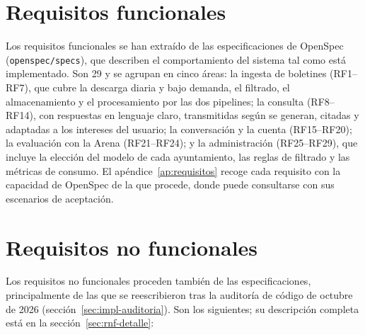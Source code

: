 \section{Requisitos funcionales}
\label{sec:rf}

Los requisitos funcionales se han extraído de las especificaciones de OpenSpec (\texttt{openspec/specs}), que describen el comportamiento del sistema tal como está implementado. Son 29 y se agrupan en cinco áreas: la ingesta de boletines (RF1--RF7), que cubre la descarga diaria y bajo demanda, el filtrado, el almacenamiento y el procesamiento por las dos pipelines; la consulta (RF8--RF14), con respuestas en lenguaje claro, transmitidas según se generan, citadas y adaptadas a los intereses del usuario; la conversación y la cuenta (RF15--RF20); la evaluación con la Arena (RF21--RF24); y la administración (RF25--RF29), que incluye la elección del modelo de cada ayuntamiento, las reglas de filtrado y las métricas de consumo. El apéndice~\ref{ap:requisitos} recoge cada requisito con la capacidad de OpenSpec de la que procede, donde puede consultarse con sus escenarios de aceptación.

\section{Requisitos no funcionales}
\label{sec:rnf}

Los requisitos no funcionales proceden también de las especificaciones, principalmente de las que se reescribieron tras la auditoría de código de octubre de 2026 (sección~\ref{sec:impl-auditoria}). Son los siguientes; su descripción completa está en la sección~\ref{sec:rnf-detalle}:

